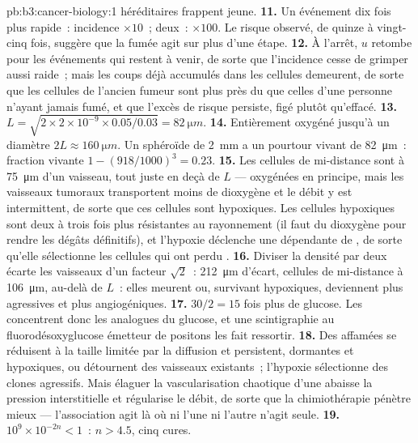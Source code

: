 \begin{solution}{pb:b3:cancer-biology:1}
héréditaires frappent jeune.
\textbf{11.} Un événement dix fois plus rapide~: incidence $\times 10$~;
deux~: $\times 100$. Le risque observé, de quinze à vingt-cinq fois,
suggère que la fumée agit sur plus d'une étape.
\textbf{12.} À l'arrêt, $u$ retombe pour les événements qui restent à
venir, de sorte que l'incidence cesse de grimper aussi raide~; mais les
coups déjà accumulés dans les cellules demeurent, de sorte que les
cellules de l'ancien fumeur sont plus près du  que celles d'une
personne n'ayant jamais fumé, et que l'excès de risque persiste, figé
plutôt qu'effacé.
\textbf{13.} $L = \sqrt{2\times 2\times 10^{-9}\times 0.05/0.03} =
\qty{82}{\micro m}$.
\textbf{14.} Entièrement oxygéné jusqu'à un diamètre $2L \approx
\qty{160}{\micro m}$. Un sphéroïde de \qty{2}{mm} a un pourtour vivant
de \qty{82}{\micro m}~: fraction vivante $1 - (918/1000)^{3} = 0.23$.
\textbf{15.} Les cellules de mi-distance sont à \qty{75}{\micro m} d'un
vaisseau, tout juste en deçà de $L$ --- oxygénées en principe, mais les
vaisseaux tumoraux transportent moins de dioxygène et le débit y est
intermittent, de sorte que ces cellules sont hypoxiques. Les cellules
hypoxiques sont deux à trois fois plus résistantes au rayonnement (il
faut du dioxygène pour rendre les dégâts définitifs), et l'hypoxie
déclenche une  dépendante de , de sorte qu'elle sélectionne
les cellules qui ont perdu .
\textbf{16.} Diviser la densité par deux écarte les vaisseaux d'un
facteur $\sqrt{2}$~: \qty{212}{\micro m} d'écart, cellules de
mi-distance à \qty{106}{\micro m}, au-delà de $L$~: elles meurent ou,
survivant hypoxiques, deviennent plus agressives et plus angiogéniques.
\textbf{17.} $30/2 = 15$ fois plus de glucose. Les  concentrent
donc les analogues du glucose, et une scintigraphie au
fluorodésoxyglucose émetteur de positons les fait ressortir.
\textbf{18.} Des  affamées se réduisent à la taille limitée par
la diffusion et persistent, dormantes et hypoxiques, ou détournent des
vaisseaux existants~; l'hypoxie sélectionne des clones agressifs. Mais
élaguer la vascularisation chaotique d'une  abaisse la pression
interstitielle et régularise le débit, de sorte que la chimiothérapie
pénètre mieux --- l'association agit là où ni l'une ni l'autre n'agit
seule.
\textbf{19.} $10^{9}\times 10^{-2n} < 1$~: $n > 4.5$, cinq cures.

\end{solution}

